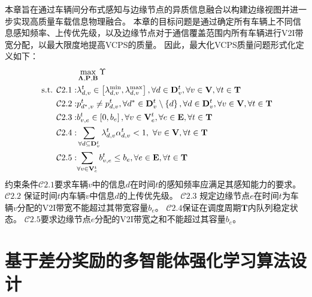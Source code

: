 本章旨在通过车辆间分布式感知与边缘节点的异质信息融合以构建边缘视图并进一步实现高质量车载信息物理融合。
本章的目标问题是通过确定所有车辆上不同信息感知频率、上传优先级，以及边缘节点对于通信覆盖范围内所有车辆进行V2I带宽分配，以最大限度地提高VCPS的质量。
因此，最大化VCPS质量问题形式化定义如下：
\begin{align}
	&\max_{\bf\Lambda, \mathbf{P}, \mathbf{B}} \Upsilon \notag \\
	\text { s.t. }
    \mathcal{C}2.1: & \lambda_{d,v}^{t} \in \left [\lambda_{d,v}^{\min} , \lambda_{d,v}^{\max} \right ], \forall d \in \mathbf{D}_v^t , \forall v \in \mathbf{V}, \forall t \in \mathbf{T} \notag \\
     \mathcal{C}2.2: &{p}_{d^*, v}^t \neq {p}_{d, v}^t, \forall d^* \in \mathbf{D}_v^t \setminus \left\{ d\right \}, \forall d \in \mathbf{D}_v^t, \forall v \in \mathbf{V}, \forall t \in \mathbf{T} \notag \\
    \mathcal{C}2.3: & b_{v, e}^t \in \left[ 0 , b_e \right ], \forall v \in \mathbf{V}_e^t, \forall e \in \mathbf{E}, \forall t \in \mathbf{T} \notag \\
    \mathcal{C}2.4: & \sum_{\forall d \subseteq \mathbf{D}_v^t} \lambda_{d,v}^{t}  \alpha_{d, v}^t < 1,\ \forall v \in \mathbf{V}, \forall t \in \mathbf{T}  \notag \\
    \mathcal{C}2.5: & {\sum_{\forall v \in \mathbf{V}_e^{t}}b_{v, e}^t} \leq b_e, \forall e \in \mathbf{E}, \forall t \in \mathbf{T}
\end{align}
约束条件$\mathcal{C}2.1$要求车辆$v$中的信息$d$在时间$t$的感知频率应满足其感知能力的要求。
$\mathcal{C}2.2$ 保证时间$t$内车辆$v$中信息$d$的上传优先级。
$\mathcal{C}2.3$ 规定边缘节点$e$在时间$t$为车辆$v$分配的V2I带宽不能超过其带宽容量$b_e$。
$\mathcal{C}2.4$保证在调度周期$\mathbf{T}$内队列稳定状态。
$\mathcal{C}2.5$要求边缘节点$e$分配的V2I带宽之和不能超过其容量$b_e$。

\section{基于差分奖励的多智能体强化学习算法设计}\label{section 2-5}

